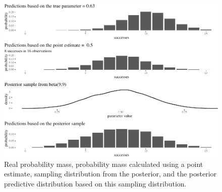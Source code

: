 \documentclass[
  10pt,
  dvipsnames,enabledeprecatedfontcommands]{scrartcl}
\begin{document}
\begin{figure}[H]

\begin{center}\includegraphics[width=0.8\linewidth]{paper-outline_files/figure-latex/fig:posteriorPrediction2-1} \end{center}


\caption{Real probability mass, probability mass calculated using a point estimate, sampling distribution from the posterior, and the posterior predictive distribution based on this sampling distribution.}
\label{fig:posteriorPrediction}
\end{figure}
\end{document}
